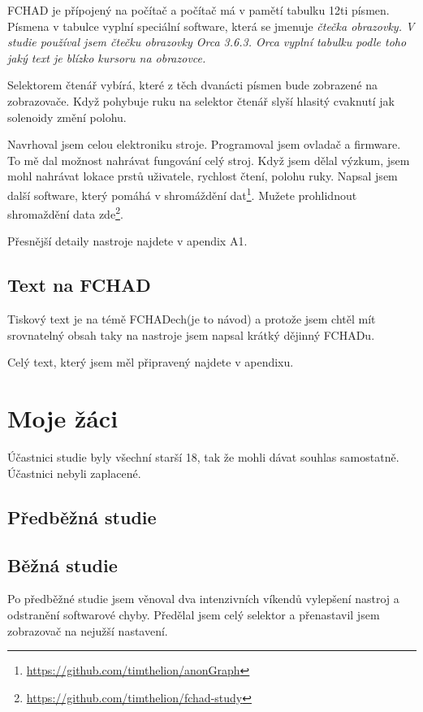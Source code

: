 FCHAD je přípojený na počítač a počítač má v pamětí tabulku 12ti písmen.  Písmena v tabulce vyplní speciální software, která se jmenuje \em čtečka obrazovky\em .  V studie používal jsem čtečku obrazovky Orca 3.6.3. Orca vyplní tabulku podle toho jaký text je blízko kursoru na obrazovce.

Selektorem čtenář vybírá, které z těch dvanácti písmen bude zobrazené na zobrazovače. Když pohybuje ruku na selektor čtenář slyší hlasitý cvaknutí jak solenoidy změní polohu.

Navrhoval jsem celou elektroniku stroje. Programoval jsem ovladač a firmware.  To mě dal možnost nahrávat fungování celý stroj.  Když jsem dělal výzkum, jsem mohl nahrávat lokace prstů uživatele, rychlost čtení, polohu ruky.  Napsal jsem další software, který pomáhá v shromáždění dat\footnote{\url{https://github.com/timthelion/anonGraph}}.  Mužete prohlidnout shromaždění data zde\footnote{\url{https://github.com/timthelion/fchad-study}}.

Přesnější detaily nastroje najdete v apendix A1.

\subsection{Text na FCHAD}
Tiskový text je na témě FCHADech(je to návod) a protože jsem chtěl mít srovnatelný obsah taky na nastroje jsem napsal krátký dějinný FCHADu.

Celý text, který jsem měl připravený najdete v apendixu.

\section{Moje žáci}

Účastnici studie byly všechní starší 18, tak že mohli dávat souhlas samostatně.  Účastnici nebyli zaplacené.

\subsection{Předběžná studie}





\subsection{Běžná studie}

Po předběžné studie jsem věnoval dva intenzivních víkendů vylepšení nastroj a odstranění softwarové chyby.  Předělal jsem celý selektor a přenastavil jsem zobrazovač na nejužší nastavení.

